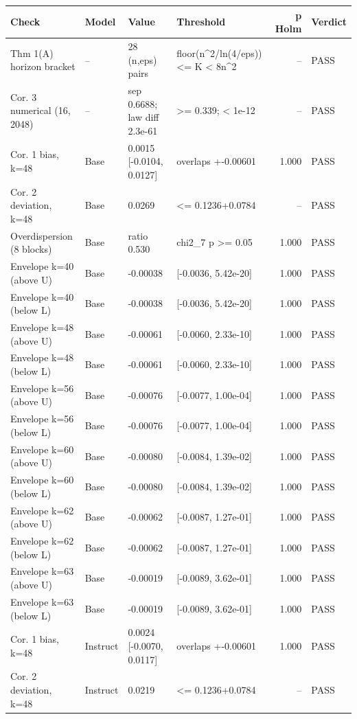 \begin{table}[t]
\centering
\small
\begin{tabular}{p{1.25in}lp{0.9in}p{0.85in}rl}
\toprule
Check & Model & Value & Threshold & p Holm & Verdict \\
\midrule
Thm 1(A) horizon bracket & -- & 28 (n,eps) pairs & floor(n^2/ln(4/eps)) <= K < 8n^2 & -- & PASS \\
Cor. 3 numerical (16, 2048) & -- & sep 0.6688; law diff 2.3e-61 & >= 0.339; < 1e-12 & -- & PASS \\
Cor. 1 bias, k=48 & Base & 0.0015 [-0.0104, 0.0127] & overlaps +-0.00601 & 1.000 & PASS \\
Cor. 2 deviation, k=48 & Base & 0.0269 & <= 0.1236+0.0784 & -- & PASS \\
Overdispersion (8 blocks) & Base & ratio 0.530 & chi2\_7 p >= 0.05 & 1.000 & PASS \\
Envelope k=40 (above U) & Base & -0.00038 & [-0.0036, 5.42e-20] & 1.000 & PASS \\
Envelope k=40 (below L) & Base & -0.00038 & [-0.0036, 5.42e-20] & 1.000 & PASS \\
Envelope k=48 (above U) & Base & -0.00061 & [-0.0060, 2.33e-10] & 1.000 & PASS \\
Envelope k=48 (below L) & Base & -0.00061 & [-0.0060, 2.33e-10] & 1.000 & PASS \\
Envelope k=56 (above U) & Base & -0.00076 & [-0.0077, 1.00e-04] & 1.000 & PASS \\
Envelope k=56 (below L) & Base & -0.00076 & [-0.0077, 1.00e-04] & 1.000 & PASS \\
Envelope k=60 (above U) & Base & -0.00080 & [-0.0084, 1.39e-02] & 1.000 & PASS \\
Envelope k=60 (below L) & Base & -0.00080 & [-0.0084, 1.39e-02] & 1.000 & PASS \\
Envelope k=62 (above U) & Base & -0.00062 & [-0.0087, 1.27e-01] & 1.000 & PASS \\
Envelope k=62 (below L) & Base & -0.00062 & [-0.0087, 1.27e-01] & 1.000 & PASS \\
Envelope k=63 (above U) & Base & -0.00019 & [-0.0089, 3.62e-01] & 1.000 & PASS \\
Envelope k=63 (below L) & Base & -0.00019 & [-0.0089, 3.62e-01] & 1.000 & PASS \\
Cor. 1 bias, k=48 & Instruct & 0.0024 [-0.0070, 0.0117] & overlaps +-0.00601 & 1.000 & PASS \\
Cor. 2 deviation, k=48 & Instruct & 0.0219 & <= 0.1236+0.0784 & -- & PASS \\

\end{tabular}
\end{table}
